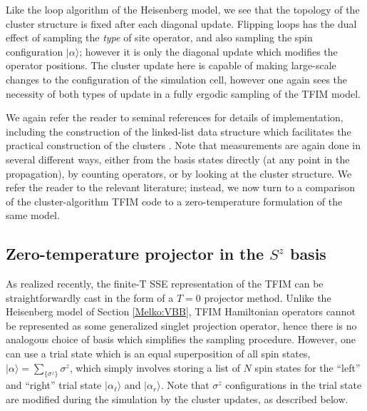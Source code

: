 \documentclass[vecphys]{svmult}
\begin{document}
Like the loop algorithm of the Heisenberg model, we see that the topology of the cluster structure is fixed after each diagonal update.  Flipping loops has the dual effect of sampling the {\em type} of site operator, and also sampling the spin configuration $|\alpha \rangle$; however it is only the diagonal update which modifies the operator positions.  
The cluster update here is capable of making large-scale changes to the configuration of the simulation cell, however one again sees the necessity of both types of update in a fully ergodic sampling of the TFIM model.

We again refer the reader to seminal references for details of implementation, including the construction of the linked-list data structure which facilitates the practical construction of the clusters \cite{Melko:Sandvik03}.  Note that measurements are again done in several different ways, either from the basis states directly (at any point in the propagation), by counting operators, or by looking at the cluster structure.  We refer the reader to the relevant literature; instead, we now turn to a comparison of the cluster-algorithm TFIM code to a zero-temperature formulation of the same model.

\subsection{Zero-temperature projector in the $S^z$ basis} \label{Melko:zeroTFIMsec}

As realized recently\cite{Melko:unpub}, the finite-T SSE representation of the TFIM can be straightforwardly cast in the form of a $T=0$ projector method.  Unlike the Heisenberg model of Section \ref{Melko:VBB}, TFIM Hamiltonian operators cannot be represented as some generalized singlet projection operator, hence there is no analogous choice of basis which simplifies the sampling procedure.  However, one can use a trial state which is an equal superposition of all spin states, $| \alpha \rangle = \sum_{\{ \sigma^z \}} \sigma^z$, which simply involves storing a list of $N$ spin states for the ``left'' and ``right'' trial state $| \alpha_{\ell}\rangle$ and $| \alpha_r \rangle$.  Note that $\sigma^z$ configurations in the trial state are modified during the simulation by the cluster updates, as described below.
\end{document}
